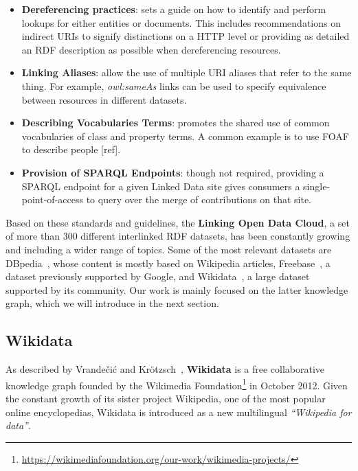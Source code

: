 \begin{itemize}
    \item \textbf{Dereferencing practices}: sets a guide on how to identify and perform lookups 
    for either entities or documents. This includes recommendations on indirect URIs to signify 
    distinctions on a HTTP level or providing as detailed an RDF description as possible when 
    dereferencing resources. 
    \item \textbf{Linking Aliases}: allow the use of multiple URI aliases that refer to the same 
    thing. For example, \textit{owl:sameAs} links can be used to specify equivalence between 
    resources in different datasets.
    \item \textbf{Describing Vocabularies Terms}: promotes the shared use of common vocabularies 
    of class and property terms. A common example is to use FOAF to describe people [ref].
    \item \textbf{Provision of SPARQL Endpoints}: though not required, providing a SPARQL endpoint 
    for a given Linked Data site gives consumers a single-point-of-access to query over the merge 
    of contributions on that site.
\end{itemize} %

Based on these standards and guidelines, the \textbf{Linking Open Data Cloud}, a set of more than 
300 different interlinked RDF datasets, has been constantly growing and including a wider range of 
topics. Some of the most relevant datasets are DBpedia~\cite{KG:dbpedia}, whose content is mostly 
based on Wikipedia articles, Freebase~\cite{KG:freebase}, a dataset previously supported by Google, 
and Wikidata~\cite{KG:wikidata}, a large dataset supported by its community. Our work is mainly 
focused on the latter knowledge graph, which we will introduce in the next section.

\subsection{Wikidata}
\label{cap2:semWeb/wikidata}
As described by Vrandečić and Krötzsch~\cite{KG:wikidata}, \textbf{Wikidata} is a free 
collaborative knowledge graph founded by the Wikimedia Foundation\footnote{\url{https://wikimediafoundation.org/our-work/wikimedia-projects/}} 
in October 2012. Given the constant growth of its sister project Wikipedia, one of the most 
popular online encyclopedias, Wikidata is introduced as a new multilingual 
\textit{“Wikipedia for data”}. 

